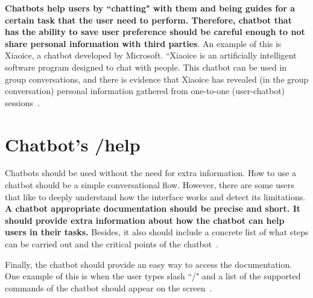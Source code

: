 \documentclass[a4paper,10pt]{article}
\begin{document}
\textbf{Chatbots help users by ``chatting" with them and being guides for a certain task that the user need to perform. Therefore, chatbot that has the ability to save user preference should be careful enough to not share personal information with third parties}. An example of this is Xiaoice, a chatbot developed by Microsoft. ``Xiaoice is an artificially intelligent software program designed to chat with people. This chatbot can be used in group conversations, and there is evidence that Xiaoice has revealed (in the group conversation) personal information gathered from one-to-one (user-chatbot) sessions~\cite{Xiaoice2016}.     


   




\section{Chatbot's /help}

Chatbots should be used without the need for extra information. How to use a chatbot should be a simple conversational flow. However, there are some users that like to deeply understand how the interface works and detect its limitations. \textbf{A chatbot appropriate documentation should be precise and short. It should provide extra information about how the chatbot can help users in their tasks.} Besides, it also should include a concrete list of what steps can be carried out and the critical points of the chatbot~\cite{HeuristicsWebPage}. 

Finally, the chatbot should provide an easy way to access the documentation. One example of this is when the user types slash ``/" and a list of the supported commands of the chatbot should appear on the screen~\cite{botfather}.  
\end{document}
